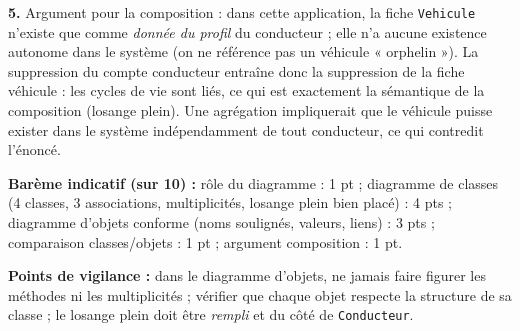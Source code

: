 \documentclass[11pt]{article}
\begin{document}
\begin{corrige}
\textbf{5.} Argument pour la composition : dans cette application, la fiche \texttt{Vehicule} n'existe que comme \emph{donnée du profil} du conducteur ; elle n'a aucune existence autonome dans le système (on ne référence pas un véhicule « orphelin »). La suppression du compte conducteur entraîne donc la suppression de la fiche véhicule : les cycles de vie sont liés, ce qui est exactement la sémantique de la composition (losange plein). Une agrégation impliquerait que le véhicule puisse exister dans le système indépendamment de tout conducteur, ce qui contredit l'énoncé.

\textbf{Barème indicatif (sur 10) :} rôle du diagramme : 1 pt ; diagramme de classes (4 classes, 3 associations, multiplicités, losange plein bien placé) : 4 pts ; diagramme d'objets conforme (noms soulignés, valeurs, liens) : 3 pts ; comparaison classes/objets : 1 pt ; argument composition : 1 pt.

\textbf{Points de vigilance :} dans le diagramme d'objets, ne jamais faire figurer les méthodes ni les multiplicités ; vérifier que chaque objet respecte la structure de sa classe ; le losange plein doit être \emph{rempli} et du côté de \texttt{Conducteur}.
\end{corrige}
\end{document}
